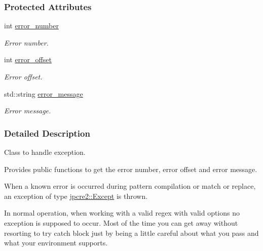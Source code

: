 \subsubsection*{Protected Attributes}
\begin{DoxyCompactItemize}
\item 
\hypertarget{classjpcre2_1_1Except_aa72e1a71b4cdf1d4baecce57b63caafc}{}\label{classjpcre2_1_1Except_aa72e1a71b4cdf1d4baecce57b63caafc} 
int \hyperlink{classjpcre2_1_1Except_aa72e1a71b4cdf1d4baecce57b63caafc}{error\+\_\+number}
\begin{DoxyCompactList}\small\item\em Error number. \end{DoxyCompactList}\item 
\hypertarget{classjpcre2_1_1Except_a12b09693ebee9b4a8b981ec1bd7506c4}{}\label{classjpcre2_1_1Except_a12b09693ebee9b4a8b981ec1bd7506c4} 
int \hyperlink{classjpcre2_1_1Except_a12b09693ebee9b4a8b981ec1bd7506c4}{error\+\_\+offset}
\begin{DoxyCompactList}\small\item\em Error offset. \end{DoxyCompactList}\item 
\hypertarget{classjpcre2_1_1Except_a88590c6c8c512608c1000639d527dd55}{}\label{classjpcre2_1_1Except_a88590c6c8c512608c1000639d527dd55} 
std\+::string \hyperlink{classjpcre2_1_1Except_a88590c6c8c512608c1000639d527dd55}{error\+\_\+message}
\begin{DoxyCompactList}\small\item\em Error message. \end{DoxyCompactList}\end{DoxyCompactItemize}


\subsubsection{Detailed Description}
Class to handle exception. 

Provides public functions to get the error number, error offset and error message.

When a known error is occurred during pattern compilation or match or replace, an exception of type {\ttfamily \hyperlink{classjpcre2_1_1Except}{jpcre2\+::\+Except}} is thrown.

In normal operation, when working with a valid regex with valid options no exception is supposed to occur. Most of the time you can get away without resorting to try catch block just by being a little careful about what you pass and what your environment supports.

